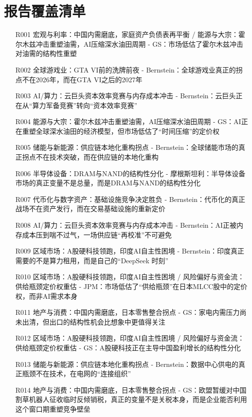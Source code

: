\documentclass[11pt]{ctexart}
\begin{document}
\section{报告覆盖清单}
\begin{itemize}
  \item [R001] 宏观与利率：中国内需磨底，家庭资产负债表再平衡 / 能源与大宗：霍尔木兹冲击重塑油需，AI压缩深水油田周期 - GS：市场低估了霍尔木兹冲击对油需的结构性重塑
  \item [R002] 全球游戏业：GTA VI前的洗牌前夜 - Bernstein：全球游戏业真正的拐点不在2026年，而在GTA VI之后的2027年
  \item [R003] AI/算力：云巨头资本效率竞赛与内存成本冲击 - Bernstein：云巨头正在从“算力军备竞赛”转向“资本效率竞赛”
  \item [R004] 能源与大宗：霍尔木兹冲击重塑油需，AI压缩深水油田周期 - GS：AI正在重塑全球深水油田的经济模型，但市场低估了“时间压缩”的定价权
  \item [R005] 储能与新能源：供应链本地化重构拐点 - Bernstein：全球储能市场的真正拐点不在技术突破，而在供应链的本地化重构
  \item [R006] 半导体设备：DRAM与NAND的结构性分化 - 摩根斯坦利：半导体设备市场的真正变量不是总量，而是DRAM与NAND的结构性分化
  \item [R007] 代币化与数字资产：基础设施竞争决定胜负 - Bernstein：代币化的真正战场不在资产发行，而在交易基础设施的重新定价
  \item [R008] AI/算力：云巨头资本效率竞赛与内存成本冲击 - Bernstein：AI正被内存成本压到喘不过气，一场供应链“再校准”不可避免
  \item [R009] 区域市场：A股硬科技领跑，印度AI自主性困境 - Bernstein：印度真正需要的不是算力租用，而是自己的“DeepSeek 时刻”
  \item [R010] 区域市场：A股硬科技领跑，印度AI自主性困境 / 风险偏好与资金流：供给瓶颈定价权重估 - JPM：市场低估了“供给瓶颈”在日本MLCC股中的定价权，而非AI需求本身
  \item [R011] 地产与消费：中国内需磨底，日本零售整合拐点 - GS：家电内需压力尚未出清，但出口的结构性机会比想象中更值得关注
  \item [R012] 区域市场：A股硬科技领跑，印度AI自主性困境 / 风险偏好与资金流：供给瓶颈定价权重估 - GS：A股硬科技正在主导中国盈利增长的结构性分化
  \item [R013] 储能与新能源：供应链本地化重构拐点 - Bernstein：数据中心供电的真正瓶颈不在技术，在电网的“连接组织”
  \item [R014] 地产与消费：中国内需磨底，日本零售整合拐点 - GS：欧盟暂缓对中国割草机器人征收临时反倾销税，真正的变量不是关税本身，而是企业能否利用这个窗口期重塑竞争壁垒

\end{itemize}
\end{document}
